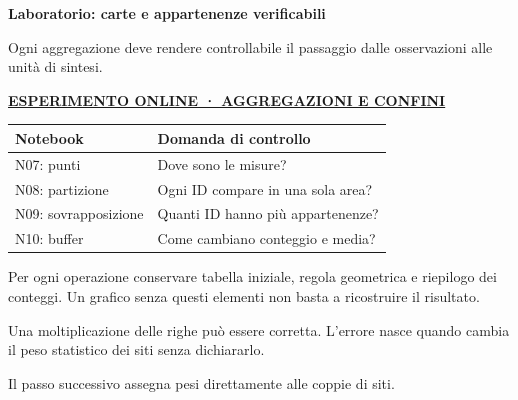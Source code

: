 \documentclass[12pt,aspectratio=1610]{beamer}
\newcommand{\PBody}[1]{\par{\fontsize{11.3}{14.8}\selectfont #1\par}}
\newcommand{\PSmall}[1]{\par{\fontsize{9.8}{13.1}\selectfont #1\par}}
\newcommand{\PInfo}[1]{%
\begin{tcolorbox}[enhanced,arc=1.6mm,boxrule=.55pt,colback=GeoTint,
 colframe=Rule!80!Classical,left=2.3mm,right=2.3mm,top=2mm,bottom=2mm,
 before skip=1mm,after skip=1mm]
\PSmall{#1}\end{tcolorbox}}
\newcommand{\PLab}[2]{\par{\color{Classical}\bfseries\fontsize{9}{11}\selectfont
\href{#1}{\MakeUppercase{#2}}}\par\vspace{1.8mm}}
\begin{document}
\begin{frame}[plain]\hypertarget{slide43}{}
\begin{lrbox}{\TitleBox}
\begin{minipage}[t]{17.7cm}\raggedright\color{Ink}\fontsize{11.3}{14.8}\selectfont
\color{Navy}\bfseries\fontsize{20.6}{24.5}\selectfont Laboratorio: carte e appartenenze verificabili
\end{minipage}\end{lrbox}

\begin{lrbox}{\RecallBox}
\begin{minipage}[t]{14.3cm}\raggedright\color{Ink}\fontsize{11.3}{14.8}\selectfont
\fontsize{10.3}{13.8}\selectfont Ogni aggregazione deve rendere controllabile il passaggio dalle osservazioni alle unità di sintesi.
\end{minipage}\end{lrbox}

\begin{lrbox}{\PilotLeftBox}
\begin{minipage}[t]{10.05cm}\raggedright\color{Ink}\fontsize{11.3}{14.8}\selectfont
\PLab{https://marzione00.github.io/Lab_Geo/\#laboratorio/m11-aggregazione}{Esperimento online · aggregazioni e confini}
{\fontsize{10.2}{13.1}\selectfont\renewcommand{\arraystretch}{1.45}\begin{tabular}{@{}p{4.0cm}p{5.0cm}@{}}\toprule
\textbf{Notebook} & \textbf{Domanda di controllo}\\\midrule
N07: punti & Dove sono le misure?\\
N08: partizione & Ogni ID compare in una sola area?\\
N09: sovrapposizione & Quanti ID hanno più appartenenze?\\
N10: buffer & Come cambiano conteggio e media?\\
\bottomrule\end{tabular}}

\end{minipage}\end{lrbox}

\begin{lrbox}{\PilotRightBox}
\begin{minipage}[t]{7.55cm}\raggedright\color{Ink}\fontsize{11.3}{14.8}\selectfont
\PBody{Per ogni operazione conservare tabella iniziale, regola geometrica e riepilogo dei conteggi. Un grafico senza questi elementi non basta a ricostruire il risultato.}
\vspace{2.5mm}
\PInfo{Una moltiplicazione delle righe può essere corretta. L’errore nasce quando cambia il peso statistico dei siti senza dichiararlo.}
\PBody{Il passo successivo assegna pesi direttamente alle coppie di siti.}
\vspace{2.5mm}


\end{minipage}
\end{lrbox}
\end{frame}
\end{document}
